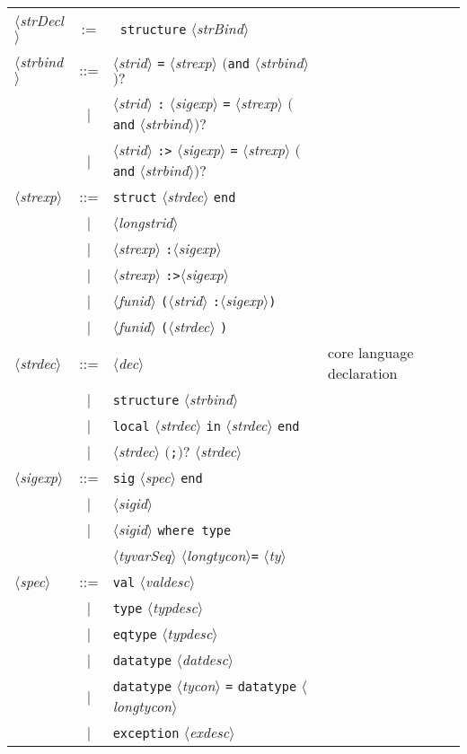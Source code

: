 \documentclass{jbook}
\newcommand{\txt}[2]{#2}
\newcommand{\vbar}{\mbox{\ $|$\ }}
\newcommand{\nonterm}[1]{\mbox{$\langle$}{\it #1}\mbox{$\rangle$}}
\newcommand{\term}[1]{\mbox{{\tt #1}}}
\newcommand{\optional}[1]{\mbox{$($}{\protect #1}\mbox{$)?$}}
\begin{document}
\begin{center}
\begin{tabular}{lcll}
\nonterm{strDecl}
  &:= &\ \term{structure} \nonterm{strBind}\\
\nonterm{strbind} &::=&
	\nonterm{strid} \term{=} \nonterm{strexp} \optional{\term{and} \nonterm{strbind}}\\
	&\vbar& \nonterm{strid} \term{:} \nonterm{sigexp} \term{=} \nonterm{strexp} \optional{\term{and} \nonterm{strbind}}\\
	&\vbar& \nonterm{strid} \term{:>} \nonterm{sigexp} \term{=} \nonterm{strexp} \optional{\term{and} \nonterm{strbind}}\\
\nonterm{strexp} &::=& \term{struct} \nonterm{strdec} \term{end} \\
&\vbar& \nonterm{longstrid} \\
&\vbar& \nonterm{strexp} \term{:}\nonterm{sigexp}\\
&\vbar& \nonterm{strexp} \term{:>}\nonterm{sigexp}\\
&\vbar& \nonterm{funid} \term{(}\nonterm{strid}
	\term{:}\nonterm{sigexp}\term{)} \\
&\vbar& \nonterm{funid} \term{(}\nonterm{strdec} \term{)} \\
\nonterm{strdec} &::=& \nonterm{dec} & \txt{核言語の宣言}{core language declaration}\\
&\vbar& \term{structure} \nonterm{strbind}\\
&\vbar& \term{local} \nonterm{strdec} \term{in} \nonterm{strdec} \term{end}\\
&\vbar& \nonterm{strdec} \optional{\term{;}} \nonterm{strdec}\\
\nonterm{sigexp} &::=& \term{sig} \nonterm{spec} \term{end} \\
&\vbar& \nonterm{sigid} \\
&\vbar& \nonterm{sigid} \term{where type} \\
&& \nonterm{tyvarSeq} \nonterm{longtycon}\term{=} \nonterm{ty} \\
\nonterm{spec} &::=& \term{val} \nonterm{valdesc} \\
&\vbar& \term{type} \nonterm{typdesc} \\
&\vbar& \term{eqtype} \nonterm{typdesc}\\
&\vbar& \term{datatype} \nonterm{datdesc} \\
&\vbar& \term{datatype} \nonterm{tycon} \term{=} \term{datatype} \nonterm{longtycon}\\
&\vbar& \term{exception} \nonterm{exdesc} \\

\end{tabular}
\end{center}
\end{document}
